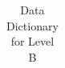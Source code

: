 \begin{table}[!htb]
\begin{tabular}{lll}
		
		\bottomrule
	\end{tabular}
	\caption{Data Dictionary for Level B}
	\label{tab:DD-LB}
\end{table}